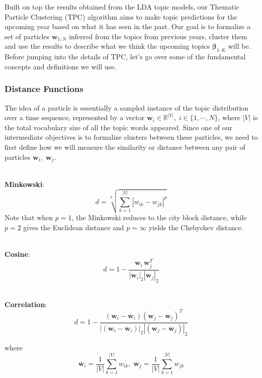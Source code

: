 \documentclass[conference]{IEEEtran}
\begin{document}
Built on top the results obtained from the LDA topic models, our Thematic Particle Clustering (TPC) algorithm aims to make topic predictions for the upcoming year based on what it has seen in the past. Our goal is to formalize a set of particles $\mathbf{w}_{1:N}$ inferred from the topics from previous years, cluster them and use the results to describe what we think the upcoming topics $\mathbf{\beta}_{1:K}$ will be. Before jumping into the details of TPC, let's go over some of the fundamental concepts and definitions we will use.

\subsubsection{Distance Functions}
The idea of a particle is essentially a sampled instance of the topic distribution over a time sequence, represented by a vector $\mathbf{w}_i\in \mathbb{R}^{|V|},\; i \in \{1,\cdots,N\}$, where $|V|$ is the total vocabulary size of all the topic words appeared. Since one of our intermediate objectives is to formalize clusters between these particles, we need to first define how we will measure the similarity or distance between any pair of particles $\mathbf{w}_i,\; \mathbf{w}_j$. 

\-\\
\textbf{Minkowski}: 
\begin{equation*}
	d = \sqrt[p]{\sum_{k=1}^{|V|}|w_{ik} - w_{jk}|^p}
\end{equation*}
 Note that when $p=1$, the Minkowski reduces to the city block distance, while $p=2$ gives the Euclidean distance and $p=\infty$ yields the Chebychev distance.

\-\\
\textbf{Cosine}: 
\begin{equation*}
d = 1 - \frac{\mathbf{w}_i\,\mathbf{w}_j^T}{|\mathbf{w}_i|_2|\mathbf{w}_j|_2}
\end{equation*}

\-\\
\textbf{Correlation}: 
\begin{equation*}
d = 1 - \frac{(\mathbf{w}_i - \overline{\mathbf{w}}_i)(\mathbf{w}_j - \overline{\mathbf{w}}_j)^T}{|(\mathbf{w}_i - \overline{\mathbf{w}}_i)|_2|(\mathbf{w}_j - \overline{\mathbf{w}}_j)|_2}
\end{equation*}

where 
\begin{equation*}
	\overline{\mathbf{w}}_i = \frac{1}{|V|}\sum_{k=1}^{|V|}w_{ik},\;
	\overline{\mathbf{w}}_j = \frac{1}{|V|}\sum_{k=1}^{|V|}w_{jk}
\end{equation*}
\end{document}
